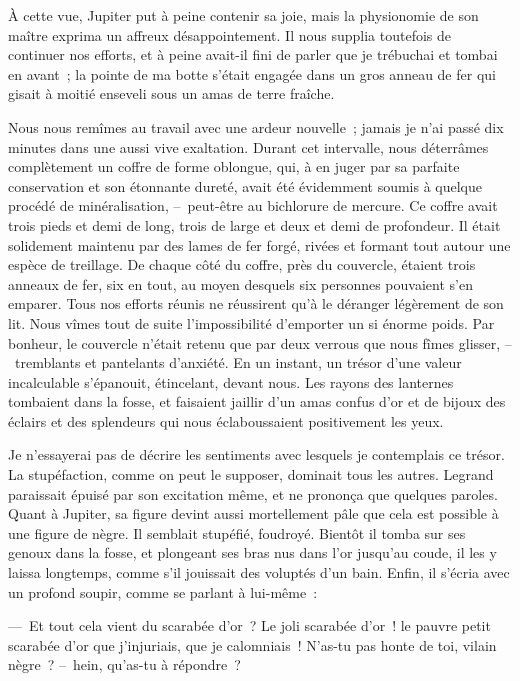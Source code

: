 \documentclass[french,twoside]{book} %
\begin{document}
À cette vue, Jupiter put à peine contenir sa joie, mais la physionomie de son maître exprima un affreux désappointement. Il nous supplia toutefois de continuer nos efforts, et à peine avait-il fini de parler que je trébuchai et tombai en avant ; la pointe de ma botte s’était engagée dans un gros anneau de fer qui gisait à moitié enseveli sous un amas de terre fraîche.\par
Nous nous remîmes au travail avec une ardeur nouvelle ; jamais je n’ai passé dix minutes dans une aussi vive exaltation. Durant cet intervalle, nous déterrâmes complètement un coffre de forme oblongue, qui, à en juger par sa parfaite conservation et son étonnante dureté, avait été évidemment soumis à quelque procédé de minéralisation, – peut-être au bichlorure de mercure. Ce coffre avait trois pieds et demi de long, trois de large et deux et demi de profondeur. Il était solidement maintenu par des lames de fer forgé, rivées et formant tout autour une espèce de treillage. De chaque côté du coffre, près du couvercle, étaient trois anneaux de fer, six en tout, au moyen desquels six personnes pouvaient s’en emparer. Tous nos efforts réunis ne réussirent qu’à le déranger légèrement de son lit. Nous vîmes tout de suite l’impossibilité d’emporter un si énorme poids. Par bonheur, le couvercle n’était retenu que par deux verrous que nous fîmes glisser, – tremblants et pantelants d’anxiété. En un instant, un trésor d’une valeur incalculable s’épanouit, étincelant, devant nous. Les rayons des lanternes tombaient dans la fosse, et faisaient jaillir d’un amas confus d’or et de bijoux des éclairs et des splendeurs qui nous éclaboussaient positivement les yeux.\par
Je n’essayerai pas de décrire les sentiments avec lesquels je contemplais ce trésor. La stupéfaction, comme on peut le supposer, dominait tous les autres. Legrand paraissait épuisé par son excitation même, et ne prononça que quelques paroles. Quant à Jupiter, sa figure devint aussi mortellement pâle que cela est possible à une figure de nègre. Il semblait stupéfié, foudroyé. Bientôt il tomba sur ses genoux dans la fosse, et plongeant ses bras nus dans l’or jusqu’au coude, il les y laissa longtemps, comme s’il jouissait des voluptés d’un bain. Enfin, il s’écria avec un profond soupir, comme se parlant à lui-même :\par
— Et tout cela vient du scarabée d’or ? Le joli scarabée d’or ! le pauvre petit scarabée d’or que j’injuriais, que je calomniais ! N’as-tu pas honte de toi, vilain nègre ? – hein, qu’as-tu à répondre ?\par
\end{document}
